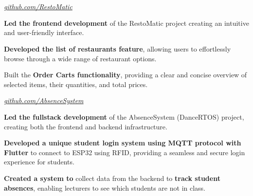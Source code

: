 \documentclass[../main.tex]{subfiles}
\begin{document}
\section{}

\begin{twocolentry}{
    \small
    \textit{\href{https://github.com/SistemBasisData2023/RestoMatic}{github.com/RestoMatic}}
}
\end{twocolentry}

\vspace{0.10 cm}
\begin{onecolentry}
\begin{highlights}
    \item \textbf{Led the frontend development} of the RestoMatic project creating an intuitive and user-friendly interface.
    \item \textbf{Developed the list of restaurants feature}, allowing users to effortlessly browse through a wide range of restaurant options.
    \item Built the \textbf{Order Carts functionality}, providing a clear and concise overview of selected items, their quantities, and total prices.
\end{highlights}
\end{onecolentry}

\vspace{0.2 cm}

\begin{twocolentry}{
    \small
    \textit{\href{https://github.com/cattyman919/AbsenceSystem/tree/main}{github.com/AbsenceSystem}}
}
\end{twocolentry}

\vspace{0.10 cm}
\begin{onecolentry}
\begin{highlights}
    \item \textbf{Led the fullstack development} of the AbsenceSystem (DanceRTOS) project, creating both the frontend and backend infrastructure.
    \item \textbf{Developed a unique student login system using MQTT protocol with Flutter} to connect to ESP32 using RFID, providing a seamless and secure login experience for students.
    \item \textbf{Created a system to} collect data from the backend to \textbf{track student absences}, enabling lecturers to see which students are not in class.
\end{highlights}
\end{onecolentry}
\end{document}
